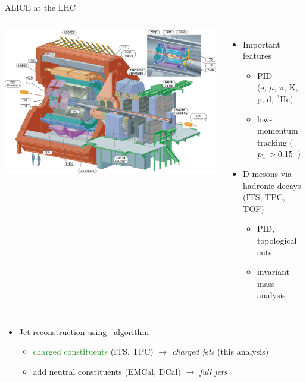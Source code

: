 \documentclass[xcolor={usenames,dvipsnames}]{beamer}
\begin{document}
\begin{frame}{ALICE at the LHC}
\begin{columns}

\includegraphics[width=\textwidth]{img/ALICE_Schematics}

\begin{itemize}
\item Important features
\begin{itemize}
\item \alert{PID} \\
(e, $\mu$, $\pi$, K, p, d, ${}^3$He)
\item \alert{low-momentum tracking} ($p_{\rm T} > 0.15$~\GeVc)
\end{itemize}
\item \alert{D mesons} via hadronic decays (ITS, TPC, TOF)
\begin{itemize}
\item PID, topological cuts
\item invariant mass analysis
\end{itemize}
\end{itemize}
\end{columns}
\begin{itemize}
\item \alert{Jet reconstruction} using \antikt\ algorithm
\begin{itemize}
\item \textcolor{ForestGreen}{charged constituents} (ITS, TPC) $\rightarrow$ \emph{charged jets} (this analysis)
\item add \textcolor{NavyBlue}{neutral constituents} (EMCal, DCal) $\rightarrow$ \emph{full jets} 
\end{itemize}
\end{itemize}
\end{frame}
\end{document}
